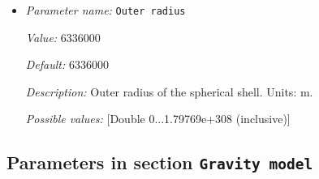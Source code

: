 \begin{itemize}
{\it Value:} 360


{\it Default:} 360


{\it Description:} Opening angle in degrees of the section of the shell that we want to build. Units: degrees.


{\it Possible values:} [Double 0...360 (inclusive)]
\item {\it Parameter name:} {\tt Outer radius}
\label{parameters:Geometry model/Spherical shell/Outer radius}


{\it Value:} 6336000


{\it Default:} 6336000


{\it Description:} Outer radius of the spherical shell. Units: m.


{\it Possible values:} [Double 0...1.79769e+308 (inclusive)]
\end{itemize}

\subsection{Parameters in section \tt Gravity model}
\label{parameters:Gravity_20model}

